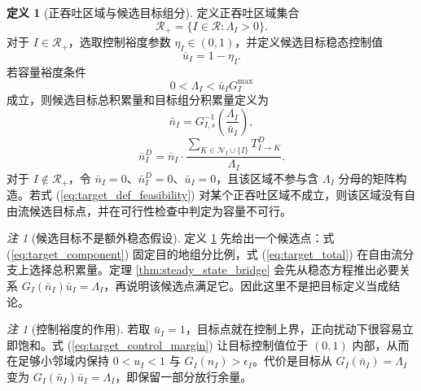 \documentclass[a4paper,12pt]{article}
\theoremstyle{plain}
\theoremstyle{definition}
\newtheorem{definition}[theorem]{定义}
\theoremstyle{remark}
\newtheorem{remark}[theorem]{注}
\begin{document}
\begin{definition}[正吞吐区域与候选目标组分]\label{def:target_component}
定义正吞吐区域集合
\begin{equation}\label{eq:positive_regions}
    \mathcal R_+ = \{I\in\mathcal R:\Lambda_I>0\}.
\end{equation}
对于 $I\in\mathcal R_+$，选取控制裕度参数 $\eta_I\in(0,1)$，并定义候选目标稳态控制值
\begin{equation}\label{eq:target_control_margin}
    \bar u_I=1-\eta_I .
\end{equation}
若容量裕度条件
\begin{equation}\label{eq:target_def_feasibility}
    0<\Lambda_I<\bar u_I G_I^{\max}
\end{equation}
成立，则候选目标总积累量和目标组分积累量定义为
\begin{equation}\label{eq:target_total}
    \bar{n}_I = G_{I,s}^{-1}\left(\frac{\Lambda_I}{\bar u_I}\right),
\end{equation}
\begin{equation} \label{eq:target_component}
    \bar{n}_I^D = \bar{n}_I \cdot \frac{\sum_{K \in \mathcal{N}_I \cup \{I\}} T_{I \to K}^D}{\Lambda_I}.
\end{equation}
对于 $I\notin\mathcal R_+$，令 $\bar n_I=0$、$\bar n_I^D=0$、$\bar u_I=0$，且该区域不参与含 $\Lambda_I$ 分母的矩阵构造。若式 (\ref{eq:target_def_feasibility}) 对某个正吞吐区域不成立，则该区域没有自由流候选目标点，并在可行性检查中判定为容量不可行。
\end{definition}

\begin{remark}[候选目标不是额外稳态假设]\label{rem:target_not_assumption}
定义 \ref{def:target_component} 先给出一个候选点：式 (\ref{eq:target_component}) 固定目的地组分比例，式 (\ref{eq:target_total}) 在自由流分支上选择总积累量。定理 \ref{thm:steady_state_bridge} 会先从稳态方程推出必要关系 $G_I(\bar n_I)\bar u_I=\Lambda_I$，再说明该候选点满足它。因此这里不是把目标定义当成结论。
\end{remark}

\begin{remark}[控制裕度的作用]\label{rem:control_margin}
若取 $\bar u_I=1$，目标点就在控制上界，正向扰动下很容易立即饱和。式 (\ref{eq:target_control_margin}) 让目标控制值位于 $(0,1)$ 内部，从而在足够小邻域内保持 $0<u_I<1$ 与 $G_I(n_I)>\epsilon_I$。代价是目标从 $G_I(\bar n_I)=\Lambda_I$ 变为 $G_I(\bar n_I)\bar u_I=\Lambda_I$，即保留一部分放行余量。
\end{remark}
\end{document}
